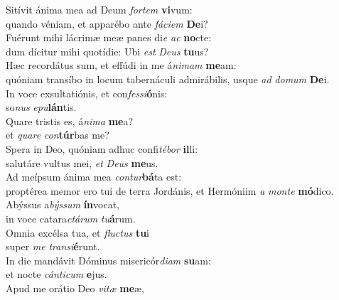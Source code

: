 \evenverse Sitívit ánima mea ad Deum \textit{for}\textit{tem} \textbf{vi}vum:~\*\\
\evenverse quando véniam, et apparébo ante \textit{fá}\textit{ci}\textit{em} \textbf{De}i?\\
\oddverse Fuérunt mihi lácrimæ meæ panes di\textit{e} \textit{ac} \textbf{no}cte:~\*\\
\oddverse dum dícitur mihi quotídie: Ubi \textit{est} \textit{De}\textit{us} \textbf{tu}us?\\
\evenverse Hæc recordátus sum, et effúdi in me á\textit{ni}\textit{mam} \textbf{me}am:~\*\\
\evenverse quóniam transíbo in locum tabernáculi admirábilis, usque \textit{ad} \textit{do}\textit{mum} \textbf{De}i.\\
\oddverse In voce exsultatiónis, et con\textit{fes}\textit{si}\textbf{ó}nis:~\*\\
\oddverse so\textit{nus} \textit{e}\textit{pu}\textbf{lán}tis.\\
\evenverse Quare tristis es, á\textit{ni}\textit{ma} \textbf{me}a?~\*\\
\evenverse et \textit{qua}\textit{re} \textit{con}\textbf{túr}bas me?\\
\oddverse Spera in Deo, quóniam adhuc confi\textit{té}\textit{bor} \textbf{il}li:~\*\\
\oddverse salutáre vultus mei, \textit{et} \textit{De}\textit{us} \textbf{me}us.\\
\evenverse Ad meípsum ánima mea \textit{con}\textit{tur}\textbf{bá}ta est:~\*\\
\evenverse proptérea memor ero tui de terra Jordánis, et Hermóniim \textit{a} \textit{mon}\textit{te} \textbf{mó}dico.\\
\oddverse Abýssus a\textit{býs}\textit{sum} \textbf{ín}vocat,~\*\\
\oddverse in voce catara\textit{ctá}\textit{rum} \textit{tu}\textbf{á}rum.\\
\evenverse Omnia excélsa tua, et \textit{flu}\textit{ctus} \textbf{tu}i~\*\\
\evenverse super \textit{me} \textit{tran}\textit{si}\textbf{é}runt.\\
\oddverse In die mandávit Dóminus misericór\textit{di}\textit{am} \textbf{su}am:~\*\\
\oddverse et nocte \textit{cán}\textit{ti}\textit{cum} \textbf{e}jus.\\
\evenverse Apud me orátio Deo \textit{vi}\textit{tæ} \textbf{me}æ,~\*\\

